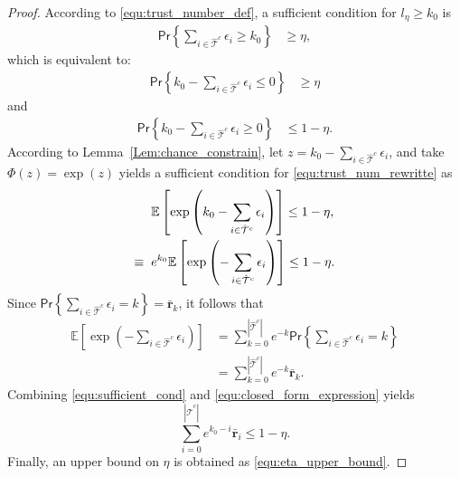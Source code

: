 \begin{proof}
According to \eqref{equ:trust_number_def}, a sufficient condition for $l_{\eta} \geq k_0$ is
\begin{align*}
\textsf{Pr} \left\{\sum_{i\in \hat{\mathcal{T}}^c} \epsilon_{i} \geq k_0 \right\} &\geq \eta,
\end{align*}
which is equivalent to:
\begin{align*}
\textsf{Pr} \left\{k_0 - \sum_{i\in \hat{\mathcal{T}}^c} \epsilon_{i}  \leq 0 \right\}&\geq \eta
\end{align*}
and
\begin{align}
    \textsf{Pr} \left\{k_0-\sum_{i\in \hat{\mathcal{T}}^c} \epsilon_{i}  \geq 0 \right\}&\leq 1-\eta. \label{equ:trust_num_rewritte}
\end{align} 
According to Lemma~\ref{Lem:chance_constrain}, let $z = k_0-\sum_{i\in \hat{\mathcal{T}}^c} \epsilon_{i}$, and take $\Phi(z) = \exp(z)$ yields a sufficient condition for \eqref{equ:trust_num_rewritte} as
\begin{align} 
&\mathbb{E}\left[\exp\left(k_0-\sum_{i\in \hat{\mathcal{T}}^c} \epsilon_{i}\right)\right] \leq 1-\eta, \nonumber \\
\equiv\hspace{2mm}& e^{k_0}\mathbb{E}\left[\exp\left(-\sum_{i\in \hat{\mathcal{T}}^c} \epsilon_{i}\right)\right] \leq 1-\eta. \label{equ:sufficient_cond}
\end{align}
Since $\displaystyle\textsf{Pr}\left\{\sum_{i\in\hat{\mathcal{T}}^c} \epsilon_i = k\right\} = \bar{\mathbf{r}}_k$, it follows that
\begin{align}
    \mathbb{E}\left[\exp\left(-\sum_{i\in \hat{\mathcal{T}}^c} \epsilon_{i}\right)\right] &= \sum_{k =0}^{|\hat{\mathcal{T}}^c|} e^{-k}  \textsf{Pr}\left\{\sum_{i\in\hat{\mathcal{T}}^c} \epsilon_i= k\right\}\nonumber \\
    &= \sum_{k =0}^{|\hat{\mathcal{T}}^c|} e^{-k} \bar{\mathbf{r}}_k.  \label{equ:closed_form_expression}
\end{align}
 Combining \eqref{equ:sufficient_cond} and \eqref{equ:closed_form_expression} yields
\begin{equation}
    \sum_{i=0}^{|\hat{\mathcal{T}}^c|} e^{k_0-i} \bar{\mathbf{r}}_i\leq 1-\eta.
\end{equation}
Finally, an upper bound on $\eta$ is obtained as \eqref{equ:eta_upper_bound}.
\end{proof}

